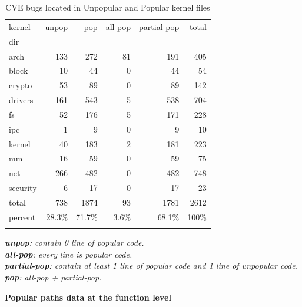 \begin{table}
\caption{CVE bugs located in Unpopular and Popular kernel files}
\label{tab:cve_files}
\begin{tabular}{l|r|r|r|r|r}
 kernel & unpop & pop & all-pop & partial-pop & total \\
 dir & \color{red}{(CVEs)} & \color{red}{(CVEs)} & \color{red}{(CVEs)} & \color{red}{(CVEs)} & \\
 \hline
 arch & 133\color{red}{(3)} & 272\color{red}{(1)} & 81 & 191\color{red}{(1)} & 405 \\
 \hline
 block & 10 & 44 & 0 & 44 & 54 \\
 \hline
 crypto & 53\color{red}{(1)} & 89\color{red}{(2)} & 0 & 89\color{red}{(2)} & 142 \\
 \hline
 drivers & 161\color{red}{(11)} & 543\color{red}{(3)} & 5 & 538\color{red}{(3)} & 704 \\
 \hline
 fs & 52\color{red}{(6)} & 176\color{red}{(2)} & 5 & 171\color{red}{(2)} & 228 \\
 \hline
 ipc & 1 & 9 & 0 & 9 & 10 \\
 \hline
 kernel & 40\color{red}{(2)} & 183 & 2 & 181 & 223 \\
 \hline
 mm & 16\color{red}{(1)} & 59\color{red}{(4)} & 0 & 59\color{red}{(4)} & 75 \\
 \hline
 net & 266\color{red}{(5)} & 482\color{red}{(3)} & 0 & 482\color{red}{(3)} & 748 \\
 \hline
 security & 6 & 17 & 0 & 17 & 23 \\
 \hline
 total & 738\color{red}{(29)} & 1874\color{red}{(15)} & 93 & 1781\color{red}{(15)} & 2612 \\
 \hline 
 percent & 28.3\% & 71.7\% & 3.6\% & 68.1\% & 100\% \\
 & \color{red}{(66\%)} & \color{red}{(34\%)} & \color{red}{(0\%)} & \color{red}{(34\%)} &
\end{tabular}
\textit{\textbf{unpop}: contain 0 line of popular code.} \\
\textit{\textbf{all-pop}: every line is popular code.} \\
\textit{\textbf{partial-pop}: contain at least 1 line of popular code and 1 line of unpopular code.} \\
\textit{\textbf{pop}: all-pop + partial-pop.}
\end{table}

\noindent
\textbf{Popular paths data at the function level}
\newline

